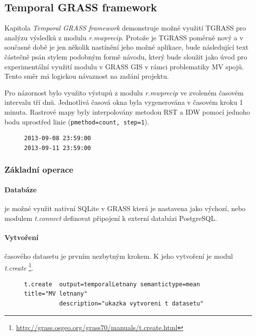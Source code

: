 \documentclass[a4paper,12pt,oneside]{report}
\begin{document}
\subsection{Temporal GRASS framework}
Kapitola \textit{Temporal GRASS framework} demonstruje možné využití TGRASS pro analýzu výsledků z modulu \textit{r.mwprecip}.  Protože je TGRASS poměrně nový a v současné době je jen několik nastínění jeho možné aplikace, bude následující text částečně psán stylem podobným formě návodu, který bude sloužit jako úvod pro experimentální využití modulu v GRASS GIS v rámci problematiky MV spojů. Tento směr má logickou návaznost na zadání projektu.


Pro názornost bylo využito výstupů z modulu \textit{r.mwprecip} ve zvoleném časovém intervalu tří dnů. Jednotlivá časová okna byla vygenerována v časovém kroku 1 minuta.  Rastrové mapy byly interpolovány metodou RST a IDW  pomocí jednoho bodu uprostřed linie (\texttt{pmethod=count, step=1}).
\begin{figure}[h!]
\begin{footnotesize}
\lstset{extendedchars=false,
escapeinside=''}
\begin{lstlisting}[style=mybash]
2013-09-08 23:59:00
2013-09-11 23:59:00                       
\end{lstlisting}
\end{footnotesize} 
\end{figure}


\subsubsection*{Základní operace}
\paragraph*{Databáze} je možné využit nativní SQLite v GRASS která je nastavena jako výchozí, nebo modulem \textit{t.connect} definovat připojení k externí databázi PostgreSQL.

\paragraph*{Vytvoření } časového  datasetu je prvním nezbytným krokem. K jeho vytvoření je modul \textit{t.create} \footnote{\url{http://grass.osgeo.org/grass70/manuals/t.create.html}}.
\begin{figure}[h!]
\begin{footnotesize}
\lstset{extendedchars=false,
escapeinside=''}
\begin{lstlisting}[style=mybash]
t.create  output=temporalLetnany semantictype=mean title="MV letnany"
          description="ukazka vytvoreni t datasetu"                        
\end{lstlisting}
\end{footnotesize} 
\end{figure}
\end{document}
